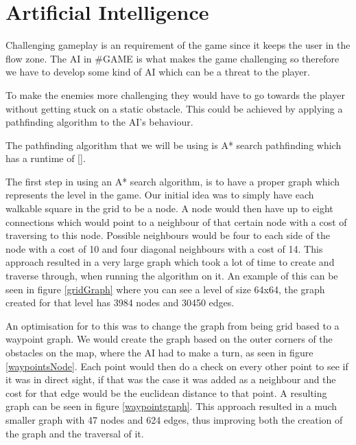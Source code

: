\section{Artificial Intelligence}
Challenging gameplay is an requirement of the game since it keeps the user in the flow zone. %
The AI in \#GAME is what makes the game challenging so therefore we have to develop some kind of AI which can be a threat to the player. 

To make the enemies more challenging they would have to go towards the player without getting stuck on a static obstacle.
This could be achieved by applying a pathfinding algorithm to the AI's behaviour.

The pathfinding algorithm that we will be using is A* search pathfinding which has a runtime of [].

The first step in using an A* search algorithm, is to have a proper graph which represents the level in the game.
Our initial idea was to simply have each walkable square in the grid to be a node.
A node would then have up to eight connections which would point to a neighbour of that certain node with a cost of traversing to this node.
Possible neighbours would be four to each side of the node with a cost of 10 and four diagonal neighbours with a cost of 14.
This approach resulted in a very large graph which took a lot of time to create and traverse through, when running the algorithm on it.
An example of this can be seen in figure \ref{gridGraph} where you can see a level of size 64x64, the graph created for that level has 3984 nodes and 30450 edges.

An optimisation for to this was to change the graph from being grid based to a waypoint graph.
We would create the graph based on the outer corners of the obstacles on the map, where the AI had to make a turn, as seen in figure \ref{waypointsNode}.
Each point would then do a check on every other point to see if it was in direct sight, if that was the case it was added as a neighbour and the cost for that edge would be the euclidean distance to that point.
A resulting graph can be seen in figure \ref{waypointgraph}.
This approach resulted in a much smaller graph with 47 nodes and 624 edges, thus improving both the creation of the graph and the traversal of it.


